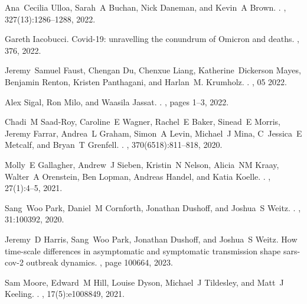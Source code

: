 \documentclass[12pt]{article}
\begin{document}
\begin{thebibliography}{10}
Ana~Cecilia Ulloa, Sarah~A Buchan, Nick Daneman, and Kevin~A Brown.
.
, 327(13):1286--1288, 2022.

Gareth Iacobucci.
\newblock Covid-19: unravelling the conundrum of {Omicron} and deaths.
, 376, 2022.

Jeremy~Samuel Faust, Chengan Du, Chenxue Liang, Katherine~Dickerson Mayes,
  Benjamin Renton, Kristen Panthagani, and Harlan~M. Krumholz.
.
, 05 2022.

Alex Sigal, Ron Milo, and Waasila Jassat.
.
, pages 1--3, 2022.

Chadi~M Saad-Roy, Caroline~E Wagner, Rachel~E Baker, Sinead~E Morris, Jeremy
  Farrar, Andrea~L Graham, Simon~A Levin, Michael~J Mina, C~Jessica~E Metcalf,
  and Bryan~T Grenfell.
.
, 370(6518):811--818, 2020.

Molly~E Gallagher, Andrew~J Sieben, Kristin~N Nelson, Alicia~NM Kraay, Walter~A
  Orenstein, Ben Lopman, Andreas Handel, and Katia Koelle.
.
, 27(1):4--5, 2021.

Sang~Woo Park, Daniel~M Cornforth, Jonathan Dushoff, and Joshua~S Weitz.
.
, 31:100392, 2020.

Jeremy~D Harris, Sang~Woo Park, Jonathan Dushoff, and Joshua~S Weitz.
\newblock How time-scale differences in asymptomatic and symptomatic
  transmission shape sars-cov-2 outbreak dynamics.
, page 100664, 2023.

Sam Moore, Edward~M Hill, Louise Dyson, Michael~J Tildesley, and Matt~J
  Keeling.
.
, 17(5):e1008849, 2021.


\end{thebibliography}
\end{document}
